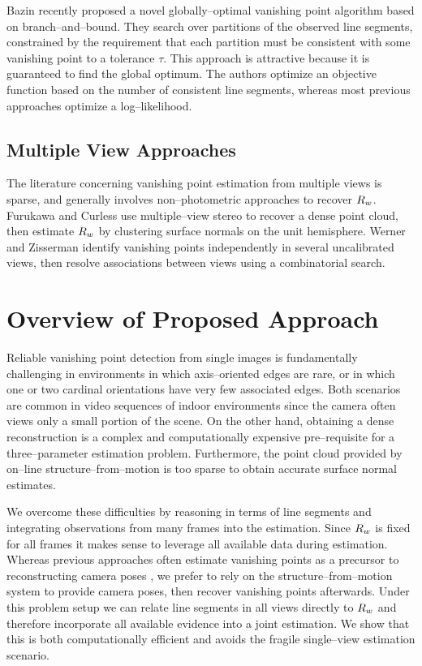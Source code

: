 Bazin \etal \cite{Bazin2012} recently proposed a novel
globally--optimal vanishing point algorithm based on
branch--and--bound. They search over partitions of the observed
line segments, constrained by the requirement that each partition must
be consistent with some vanishing point to a tolerance $\tau$. This
approach is attractive because it is guaranteed to find the global
optimum. The authors optimize an objective function based on the
number of consistent line segments, whereas most previous approaches
optimize a log--likelihood.\changedsinceviva

\subsection{Multiple View Approaches}

The literature concerning vanishing point estimation from multiple
views is sparse, and generally involves non--photometric approaches to
recover $\SceneR$. Furukawa and Curless \cite{Furukawa09} use
multiple--view stereo to recover a dense point cloud, then estimate
$\SceneR$ by clustering surface normals on the unit hemisphere. Werner
and Zisserman \cite{Werner2002} identify vanishing points
independently in several uncalibrated views, then resolve associations
between views using a combinatorial search.

\section{Overview of Proposed Approach}

Reliable vanishing point detection from single images is fundamentally
challenging in environments in which axis--oriented edges are rare, or
in which one or two cardinal orientations have very few associated
edges. Both scenarios are common in video sequences of indoor
environments since the camera often views only a small portion of the
scene. On the other hand, obtaining a dense reconstruction is a
complex and computationally expensive pre--requisite for a
three--parameter estimation problem. Furthermore, the point cloud
provided by on--line structure--from--motion is too sparse to obtain
accurate surface normal estimates.

We overcome these difficulties by reasoning in terms of line
segments and integrating observations from many frames into the
estimation. Since $\SceneR$ is fixed for all frames it makes sense to
leverage all available data during estimation. Whereas previous
approaches often estimate vanishing points as a precursor to
reconstructing camera poses \cite{Zhang02,Werner2002}, we prefer to rely
on the structure--from--motion system to provide camera poses,
then recover vanishing points afterwards. Under this problem setup we
can relate line segments in all views directly to $\SceneR$ and
therefore incorporate all available evidence into a joint
estimation. We show that this is both computationally efficient and
avoids the fragile single--view estimation scenario.

